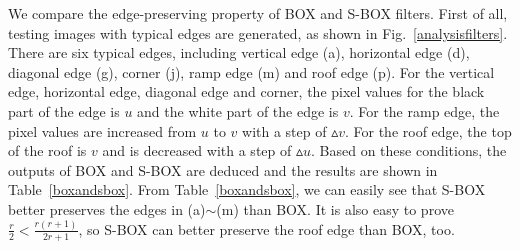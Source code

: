 \documentclass[10pt,twocolumn,letterpaper]{article}
\begin{document}
We compare the edge-preserving property of BOX and S-BOX filters. First of all, testing images with typical edges are generated, as shown in Fig.~\ref{analysisfilters}. There are six typical edges, including vertical edge (a), horizontal edge (d), diagonal edge (g), corner (j), ramp edge (m) and roof edge (p). For the vertical edge, horizontal edge, diagonal edge and corner, the pixel values for the black part of the edge is $u$ and the white part of the edge is $v$. For the ramp edge, the pixel values are increased from $u$ to $v$ with a step of $\vartriangle{v}$. For the roof edge, the top of the roof is $v$ and is decreased with a step of $\vartriangle{u}$. Based on these conditions, the outputs of BOX and S-BOX are deduced and the results are shown in Table~\ref{boxandsbox}. From Table~\ref{boxandsbox}, we can easily see that S-BOX better preserves the edges in (a)$\sim$(m) than BOX. It is also easy to prove $\frac{r}{2}<\frac{r(r+1)}{2r+1}$, so S-BOX can better preserve the roof edge than BOX, too. 
\end{document}
